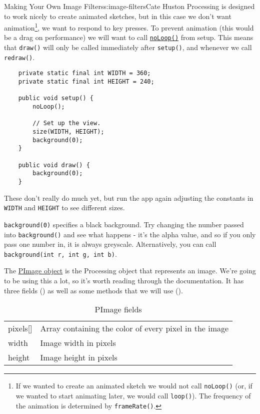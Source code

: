 \begin{aosachapter}{Making Your Own Image Filters}{s:image-filters}{Cate Huston}
Processing is designed to work nicely to create animated sketches, but
in this case we don't want animation\footnote{If we wanted to create an
  animated sketch we would not call \texttt{noLoop()} (or, if we wanted
  to start animating later, we would call \texttt{loop()}). The
  frequency of the animation is determined by \texttt{frameRate()}.}, we
want to respond to key presses. To prevent animation (this would be a
drag on performance) we will want to call
\href{http://www.processing.org/reference/noLoop_.html}{\texttt{noLoop()}}
from setup. This means that \texttt{draw()} will only be called
immediately after \texttt{setup()}, and whenever we call
\texttt{redraw()}.

\begin{verbatim}
    private static final int WIDTH = 360;
    private static final int HEIGHT = 240;

    public void setup() {
        noLoop();

        // Set up the view.
        size(WIDTH, HEIGHT);
        background(0);
    }
        
    public void draw() {
        background(0);
    }
\end{verbatim}

These don't really do much yet, but run the app again adjusting the
constants in \texttt{WIDTH} and \texttt{HEIGHT} to see different sizes.

\texttt{background(0)} specifies a black background. Try changing the
number passed into \texttt{background()} and see what happens - it's the
alpha value, and so if you only pass one number in, it is always
greyscale. Alternatively, you can call
\texttt{background(int r, int g, int b)}.

\label{pimage}

The \href{http://processing.org/reference/PImage.html}{PImage object} is
the Processing object that represents an image. We're going to be using
this a lot, so it's worth reading through the documentation. It has
three fields () as well as
some methods that we will use
().

\begin{table}
\centering
{\footnotesize
{}
\begin{tabular}{ll}
\hline
pixels[] & Array containing the color of every pixel in the image \\
width & Image width in pixels \\
height & Image height in pixels \\
\hline
\end{tabular}
}
\caption{PImage fields}
\label{500l.imagefilters.pimagefields}
\end{table}


\end{aosachapter}
